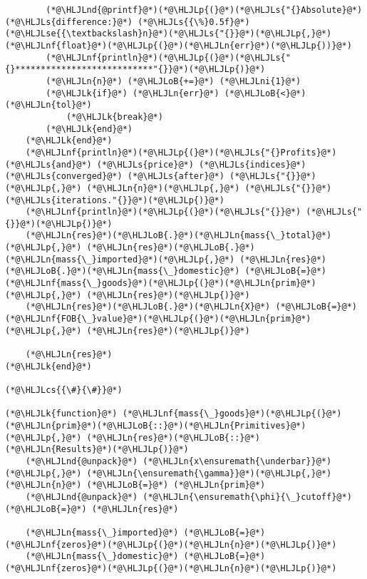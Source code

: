 \documentclass[12pt,a4paper]{article}
\newcommand{\HLJLk}[1]{\textcolor[RGB]{148,91,176}{\textbf{#1}}}
\newcommand{\HLJLn}[1]{#1}
\newcommand{\HLJLnd}[1]{\textcolor[RGB]{214,102,97}{#1}}
\newcommand{\HLJLnf}[1]{\textcolor[RGB]{66,102,213}{#1}}
\newcommand{\HLJLs}[1]{\textcolor[RGB]{201,61,57}{#1}}
\newcommand{\HLJLse}[1]{\textcolor[RGB]{59,151,46}{#1}}
\newcommand{\HLJLni}[1]{\textcolor[RGB]{59,151,46}{#1}}
\newcommand{\HLJLoB}[1]{\textcolor[RGB]{102,102,102}{\textbf{#1}}}
\newcommand{\HLJLp}[1]{#1}
\newcommand{\HLJLcs}[1]{\textcolor[RGB]{153,153,119}{\textit{#1}}}
\begin{document}
\begin{lstlisting}
        (*@\HLJLnd{@printf}@*)(*@\HLJLp{(}@*)(*@\HLJLs{"{}Absolute}@*) (*@\HLJLs{difference:}@*) (*@\HLJLs{{\%}0.5f}@*) (*@\HLJLse{{\textbackslash}n}@*)(*@\HLJLs{"{}}@*)(*@\HLJLp{,}@*) (*@\HLJLnf{float}@*)(*@\HLJLp{(}@*)(*@\HLJLn{err}@*)(*@\HLJLp{))}@*)
        (*@\HLJLnf{println}@*)(*@\HLJLp{(}@*)(*@\HLJLs{"{}***************************"{}}@*)(*@\HLJLp{)}@*)
        (*@\HLJLn{n}@*) (*@\HLJLoB{+=}@*) (*@\HLJLni{1}@*)
        (*@\HLJLk{if}@*) (*@\HLJLn{err}@*) (*@\HLJLoB{<}@*) (*@\HLJLn{tol}@*)
            (*@\HLJLk{break}@*)
        (*@\HLJLk{end}@*)
    (*@\HLJLk{end}@*)
    (*@\HLJLnf{println}@*)(*@\HLJLp{(}@*)(*@\HLJLs{"{}Profits}@*) (*@\HLJLs{and}@*) (*@\HLJLs{price}@*) (*@\HLJLs{indices}@*) (*@\HLJLs{converged}@*) (*@\HLJLs{after}@*) (*@\HLJLs{"{}}@*)(*@\HLJLp{,}@*) (*@\HLJLn{n}@*)(*@\HLJLp{,}@*) (*@\HLJLs{"{}}@*) (*@\HLJLs{iterations."{}}@*)(*@\HLJLp{)}@*)
    (*@\HLJLnf{println}@*)(*@\HLJLp{(}@*)(*@\HLJLs{"{}}@*) (*@\HLJLs{"{}}@*)(*@\HLJLp{)}@*)
    (*@\HLJLn{res}@*)(*@\HLJLoB{.}@*)(*@\HLJLn{mass{\_}total}@*)(*@\HLJLp{,}@*) (*@\HLJLn{res}@*)(*@\HLJLoB{.}@*)(*@\HLJLn{mass{\_}imported}@*)(*@\HLJLp{,}@*) (*@\HLJLn{res}@*)(*@\HLJLoB{.}@*)(*@\HLJLn{mass{\_}domestic}@*) (*@\HLJLoB{=}@*) (*@\HLJLnf{mass{\_}goods}@*)(*@\HLJLp{(}@*)(*@\HLJLn{prim}@*)(*@\HLJLp{,}@*) (*@\HLJLn{res}@*)(*@\HLJLp{)}@*)
    (*@\HLJLn{res}@*)(*@\HLJLoB{.}@*)(*@\HLJLn{X}@*) (*@\HLJLoB{=}@*) (*@\HLJLnf{FOB{\_}value}@*)(*@\HLJLp{(}@*)(*@\HLJLn{prim}@*)(*@\HLJLp{,}@*) (*@\HLJLn{res}@*)(*@\HLJLp{)}@*)

    (*@\HLJLn{res}@*)
(*@\HLJLk{end}@*)

(*@\HLJLcs{{\#}{\#}}@*)

(*@\HLJLk{function}@*) (*@\HLJLnf{mass{\_}goods}@*)(*@\HLJLp{(}@*)(*@\HLJLn{prim}@*)(*@\HLJLoB{::}@*)(*@\HLJLn{Primitives}@*)(*@\HLJLp{,}@*) (*@\HLJLn{res}@*)(*@\HLJLoB{::}@*)(*@\HLJLn{Results}@*)(*@\HLJLp{)}@*)
    (*@\HLJLnd{@unpack}@*) (*@\HLJLn{x\ensuremath{\underbar}}@*)(*@\HLJLp{,}@*) (*@\HLJLn{\ensuremath{\gamma}}@*)(*@\HLJLp{,}@*) (*@\HLJLn{n}@*) (*@\HLJLoB{=}@*) (*@\HLJLn{prim}@*)
    (*@\HLJLnd{@unpack}@*) (*@\HLJLn{\ensuremath{\phi}{\_}cutoff}@*) (*@\HLJLoB{=}@*) (*@\HLJLn{res}@*)

    (*@\HLJLn{mass{\_}imported}@*) (*@\HLJLoB{=}@*) (*@\HLJLnf{zeros}@*)(*@\HLJLp{(}@*)(*@\HLJLn{n}@*)(*@\HLJLp{)}@*)
    (*@\HLJLn{mass{\_}domestic}@*) (*@\HLJLoB{=}@*) (*@\HLJLnf{zeros}@*)(*@\HLJLp{(}@*)(*@\HLJLn{n}@*)(*@\HLJLp{)}@*)


\end{lstlisting}
\end{document}
